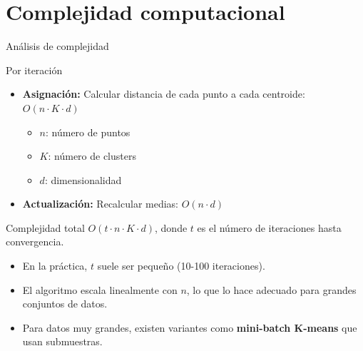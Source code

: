 \documentclass[aspectratio=169]{beamer}
\begin{document}
\section{Complejidad computacional}

\begin{frame}{Análisis de complejidad}
    \begin{block}{Por iteración}
        \begin{itemize}
            \item \textbf{Asignación:} Calcular distancia de cada punto a cada centroide: \(O(n \cdot K \cdot d)\)
            \begin{itemize}
                \item \(n\): número de puntos
                \item \(K\): número de clusters
                \item \(d\): dimensionalidad
            \end{itemize}
            \item \textbf{Actualización:} Recalcular medias: \(O(n \cdot d)\)
        \end{itemize}
    \end{block}
    
    \begin{block}{Complejidad total}
        \(O(t \cdot n \cdot K \cdot d)\), donde \(t\) es el número de iteraciones hasta convergencia.
    \end{block}
    
    \begin{itemize}
        \item En la práctica, \(t\) suele ser pequeño (10-100 iteraciones).
        \item El algoritmo escala linealmente con \(n\), lo que lo hace adecuado para grandes conjuntos de datos.
        \item Para datos muy grandes, existen variantes como \textbf{mini-batch K-means} que usan submuestras.
    \end{itemize}
\end{frame}
\end{document}
